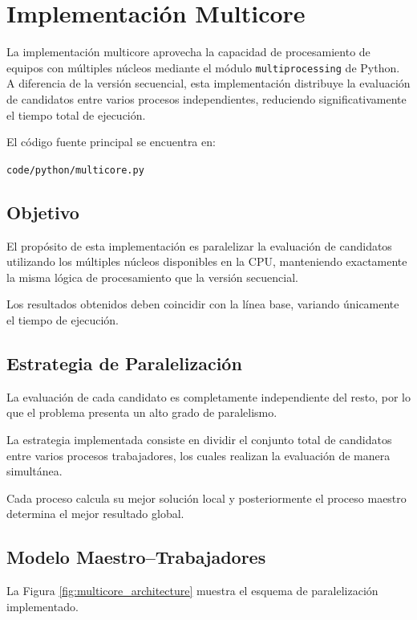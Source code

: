 \chapter{Implementación Multicore}

La implementación multicore aprovecha la capacidad de procesamiento de equipos con múltiples núcleos mediante el módulo \texttt{multiprocessing} de Python. A diferencia de la versión secuencial, esta implementación distribuye la evaluación de candidatos entre varios procesos independientes, reduciendo significativamente el tiempo total de ejecución.

El código fuente principal se encuentra en:

\begin{center}
\texttt{code/python/multicore.py}
\end{center}

\section{Objetivo}

El propósito de esta implementación es paralelizar la evaluación de candidatos utilizando los múltiples núcleos disponibles en la CPU, manteniendo exactamente la misma lógica de procesamiento que la versión secuencial.

Los resultados obtenidos deben coincidir con la línea base, variando únicamente el tiempo de ejecución.

\section{Estrategia de Paralelización}

La evaluación de cada candidato es completamente independiente del resto, por lo que el problema presenta un alto grado de paralelismo.

La estrategia implementada consiste en dividir el conjunto total de candidatos entre varios procesos trabajadores, los cuales realizan la evaluación de manera simultánea.

Cada proceso calcula su mejor solución local y posteriormente el proceso maestro determina el mejor resultado global.

\section{Modelo Maestro--Trabajadores}

La Figura \ref{fig:multicore_architecture} muestra el esquema de paralelización implementado.


